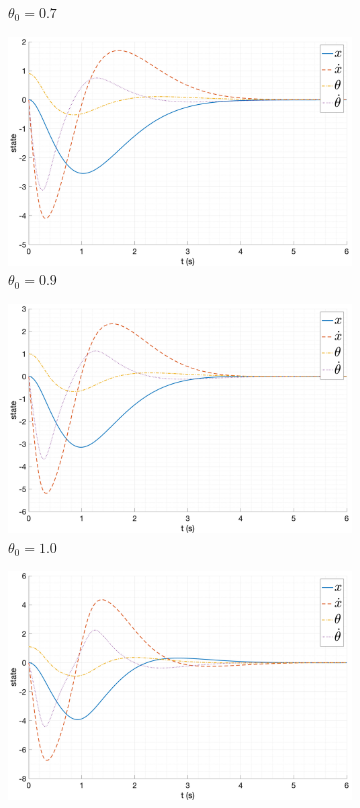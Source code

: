 \begin{figure}[ht!]
\begin{subfigure}[b]{0.45\textwidth}
        \caption{$\theta_0 = 0.7$}
    \end{subfigure}
    \begin{subfigure}[b]{0.45\textwidth}
        \includegraphics[width=\textwidth]{media/plots/modal_control/state_3.png}
        \caption{$\theta_0 = 0.9$}
    \end{subfigure}
    \begin{subfigure}[b]{0.45\textwidth}
        \includegraphics[width=\textwidth]{media/plots/modal_control/state_4.png}
        \caption{$\theta_0 = 1.0$}
    \end{subfigure}
    \begin{subfigure}[b]{0.45\textwidth}
        \includegraphics[width=\textwidth]{media/plots/modal_control/state_5.png}

\end{subfigure}
\end{figure}
